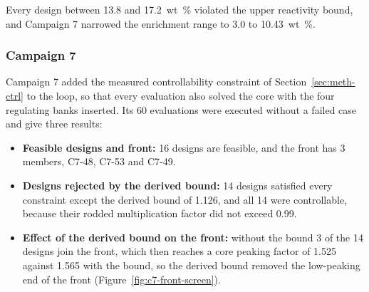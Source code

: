 Every design between 13.8 and \SI{17.2}{wt\%} violated the upper
reactivity bound, and Campaign 7 narrowed the enrichment range to 3.0
to \SI{10.43}{wt\%}.

\subsubsection{Campaign 7}
\label{sec:res-hist-c7}
\label{sec:res-c7-ctrl}\label{sec:res-c6-blocks}\label{tab:c6-blocks}\label{tab:c6-b2-collapse}\label{tab:c6-b3-fail}\label{fig:c6-convergence}\label{sec:res-c6-front}\label{fig:c6-front}\label{tab:c6-front}\label{fig:c6-parallel}\label{sec:res-c6-influence}\label{fig:c6-influence}\label{tab:c6-spearman}\label{fig:c6-constraints}\label{sec:res-c6-bscreen}\label{tab:c6-front-screened}\label{sec:res-c7}\label{sec:res-c7-basis}\label{eq:g-ctrl}\label{sec:res-c7-blocks}\label{tab:c7-blocks}\label{fig:c7-diversity}\label{tab:c7-nesting}\label{fig:c7-screens}\label{tab:c7-front}\label{fig:c7-pareto}\label{sec:res-c7-worth}\label{fig:c7-worth}\label{fig:c7-influence}\label{sec:res-c7-rodded}\label{fig:c7-rodded}\label{sec:res-c7-uncertainty}\label{fig:c7-histories}\label{fig:c7-uncertainty}\label{tab:c7-uncertainty}\label{sec:res-c7-hump}\label{fig:c7-khist-gd}\label{tab:c7-hump}\label{sec:res-c7-cost}\label{sec:res-c7-limits}

Campaign 7 added the measured controllability constraint of
Section~\ref{sec:meth-ctrl} to the loop, so that every evaluation also
solved the core with the four regulating banks inserted. Its 60
evaluations were executed without a failed case and give three results:

\begin{itemize}
  \item \textbf{Feasible designs and front:} 16 designs are feasible,
        and the front has 3 members, C7-48, C7-53 and C7-49.
  \item \textbf{Designs rejected by the derived bound:} 14 designs
        satisfied every constraint except the derived bound of 1.126,
        and all 14 were controllable, because their rodded
        multiplication factor did not exceed 0.99.
  \item \textbf{Effect of the derived bound on the front:} without the
        bound 3 of the 14 designs join the front, which then reaches a
        core peaking factor of 1.525 against 1.565 with the bound, so
        the derived bound removed the low-peaking end of the front
        (Figure~\ref{fig:c7-front-screen}).
\end{itemize}


